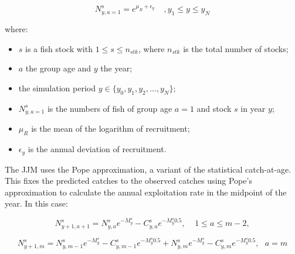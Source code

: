 \documentclass{article}
\begin{document}
\begin{equation}
N^s_{y,a=1}=e^{\mu_R+\epsilon_{y}}  \ \ \ \ \ , y_{1}\leq y \leq y_{N}
\end{equation}

where:
\begin{itemize}
    \item $s$ is a fish stock with $1\leq s \leq n_{stk}$, where $n_{stk}$ is the total number of stocks; 
    \item $a$ the group age and $y$ the year;
    
    \item the simulation period ${y \in \{y_{0}, y_1, y_2,..., y_{N}\}}$;   
  
    \item $N^s_{y,a=1}$ is the numbers of fish of group age $a=1$ and stock $s$ in year $y$;
    
    \item $\mu_R$ is the mean  of the logarithm of recruitment;

    \item $\epsilon_{y}$ is the annual deviation of recruitment.
    
\end{itemize}

The JJM uses the Pope approximation, a variant of the statistical catch-at-age. This fixes the predicted catches to the observed catches using Pope's approximation to calculate the annual exploitation rate in the midpoint of the year. In this case:

\begin{equation}
N^{s}_{y+1,a+1}=N^s_{y,a}e^{-M^s_y}-C^s_{y,a}e^{-M^s_y 0.5}, \ \ \ \ \ 1\leq a \leq m-2,
\end{equation}
    
\begin{equation}
N^s_{y+1,m}=N^s_{y,m-1}e^{-M^s_y}-C^s_{y,m-1}e^{-M^s_y 0.5}+N^s_{y,m}e^{-M^s_y}-C^s_{y,m}e^{-M^s_y 0.5}, \ \ \ a = m
\end{equation}
\end{document}
